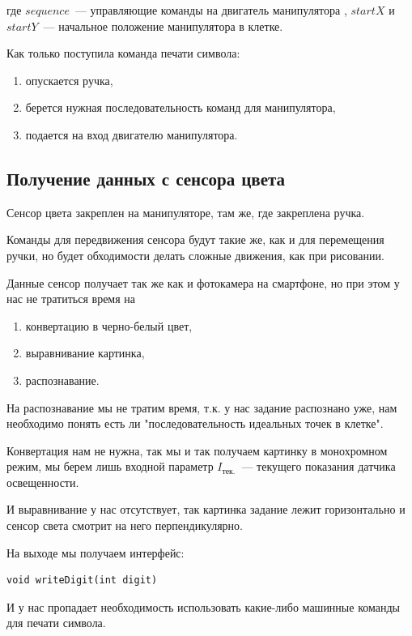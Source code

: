 где $sequence$~--- управляющие команды на двигатель манипулятора , $startX$ и $startY$~--- начальное положение манипулятора в клетке.

Как только поступила команда печати символа:

 \begin{enumerate}
  \item опускается ручка,
  \item берется нужная последовательность команд для манипулятора,
  \item подается на вход двигателю манипулятора.
\end{enumerate}



\subsection{Получение данных с сенсора цвета}

Сенсор цвета закреплен на манипуляторе, там же, где закреплена ручка. 

Команды для передвижения сенсора будут такие же, как и для перемещения ручки, но будет обходимости делать сложные движения, как при рисовании.

Данные сенсор получает так же как и фотокамера на смартфоне, но при этом у нас не тратиться время на 
 \begin{enumerate}
  \item конвертацию в черно-белый цвет,
  \item выравнивание картинка,
  \item распознавание.
\end{enumerate}

На распознавание мы не тратим время, т.к. у нас задание распознано уже, нам необходимо понять есть ли "последовательность идеальных точек в клетке". 

Конвертация нам не нужна, так мы и так получаем картинку в монохромном режим, мы берем лишь входной параметр $I_\text{тек.}$~--- текущего показания датчика освещенности.

И выравнивание у нас отсутствует, так картинка задание лежит горизонтально и сенсор света смотрит на него перпендикулярно.

На выходе мы получаем интерфейс:
\begin{lstlisting}[caption={Интерфейс для вывода цифры}, label=lst:design6]
void writeDigit(int digit)
\end{lstlisting}

И у нас пропадает необходимость использовать какие-либо машинные команды для печати символа.





